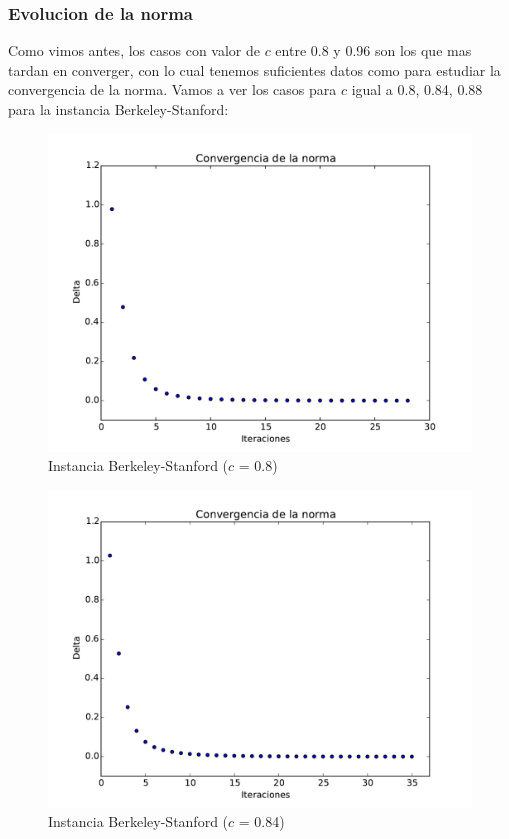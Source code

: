 \subsubsection{Evolucion de la norma}

Como vimos antes, los casos con valor de $c$ entre 0.8 y 0.96 son los que mas tardan en converger, con lo cual tenemos suficientes datos como para estudiar la convergencia de la norma. Vamos a ver los casos para $c$ igual a 0.8, 0.84, 0.88 para la instancia Berkeley-Stanford:

\begin{figure}[h]
\centering
\includegraphics[scale=0.4]{images/normas/web-BerkStan_20.pdf}
\caption{Instancia Berkeley-Stanford ($c$ = 0.8)}
\label{timePageRank}
\end{figure}

\newpage

\begin{figure}[h]
\centering
\includegraphics[scale=0.4]{images/normas/web-BerkStan_21.pdf}
\caption{Instancia Berkeley-Stanford ($c$ = 0.84)}
\label{timePageRank}
\end{figure}

